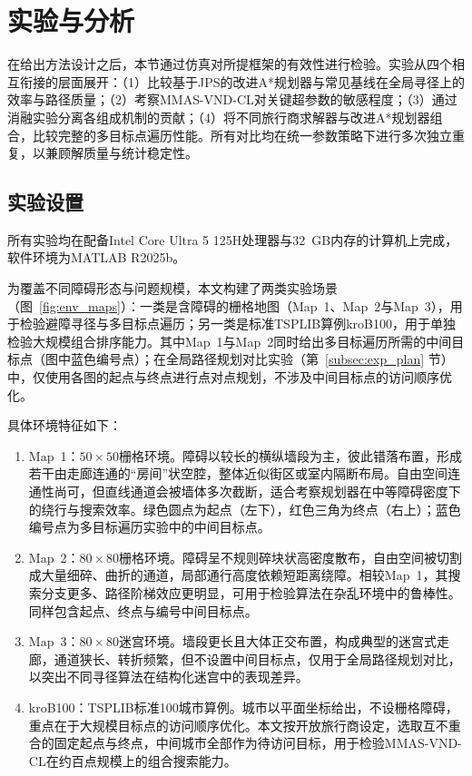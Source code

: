 \documentclass[lettersize,journal]{IEEEtran}
\begin{document}
\section{实验与分析}

\label{sec:exp}

在给出方法设计之后，本节通过仿真对所提框架的有效性进行检验。实验从四个相互衔接的层面展开：（1）比较基于JPS的改进A*规划器与常见基线在全局寻径上的效率与路径质量；（2）考察MMAS-VND-CL对关键超参数的敏感程度；（3）通过消融实验分离各组成机制的贡献；（4）将不同旅行商求解器与改进A*规划器组合，比较完整的多目标点遍历性能。所有对比均在统一参数策略下进行多次独立重复，以兼顾解质量与统计稳定性。

\subsection{实验设置}

所有实验均在配备Intel Core Ultra 5 125H处理器与32~GB内存的计算机上完成，软件环境为MATLAB R2025b。

为覆盖不同障碍形态与问题规模，本文构建了两类实验场景（图~\textcolor{blue}{\ref{fig:env_maps}}）：一类是含障碍的栅格地图（Map~1、Map~2与Map~3），用于检验避障寻径与多目标点遍历；另一类是标准TSPLIB算例kroB100，用于单独检验大规模组合排序能力。其中Map~1与Map~2同时给出多目标遍历所需的中间目标点（图中蓝色编号点）；在全局路径规划对比实验（第~\textcolor{blue}{\ref{subsec:exp_plan}} 节）中，仅使用各图的起点与终点进行点对点规划，不涉及中间目标点的访问顺序优化。

具体环境特征如下：

\begin{enumerate}

\item Map~1：$50\times 50$栅格环境。障碍以较长的横纵墙段为主，彼此错落布置，形成若干由走廊连通的“房间”状空腔，整体近似街区或室内隔断布局。自由空间连通性尚可，但直线通道会被墙体多次截断，适合考察规划器在中等障碍密度下的绕行与搜索效率。绿色圆点为起点（左下），红色三角为终点（右上）；蓝色编号点为多目标遍历实验中的中间目标点。

\item Map~2：$80\times 80$栅格环境。障碍呈不规则碎块状高密度散布，自由空间被切割成大量细碎、曲折的通道，局部通行高度依赖短距离绕障。相较Map~1，其搜索分支更多、路径阶梯效应更明显，可用于检验算法在杂乱环境中的鲁棒性。同样包含起点、终点与编号中间目标点。

\item Map~3：$80\times 80$迷宫环境。墙段更长且大体正交布置，构成典型的迷宫式走廊，通道狭长、转折频繁，但不设置中间目标点，仅用于全局路径规划对比，以突出不同寻径算法在结构化迷宫中的表现差异。

\item kroB100：TSPLIB标准100城市算例。城市以平面坐标给出，不设栅格障碍，重点在于大规模目标点的访问顺序优化。本文按开放旅行商设定，选取互不重合的固定起点与终点，中间城市全部作为待访问目标，用于检验MMAS-VND-CL在约百点规模上的组合搜索能力。

\end{enumerate}
\end{document}

